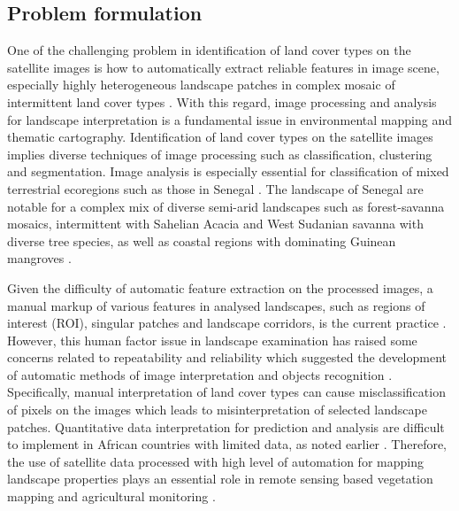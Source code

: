 \documentclass[land,article,submit,pdftex,moreauthors]{Definitions/mdpi}
\begin{document}
\subsection{Problem formulation}

One of the challenging problem in identification of land cover types on the satellite images is how to automatically extract reliable features in image scene, especially highly heterogeneous landscape patches in complex mosaic of intermittent land cover types \cite{CAMPOS2018211,SYIFA2020919}. With this regard, image processing and analysis for landscape interpretation is a fundamental issue in environmental mapping and thematic cartography. Identification of land cover types on the satellite images implies diverse techniques of image processing such as classification, clustering and segmentation. Image analysis is especially essential for classification of mixed terrestrial ecoregions such as those in Senegal \cite{BUDDE2004481}. The landscape of Senegal are notable for a complex mix of diverse semi-arid landscapes such as forest-savanna mosaics, intermittent with Sahelian Acacia and West Sudanian savanna with diverse tree species, as well as coastal regions with dominating Guinean mangroves \cite{TAPPAN2004427,DEANS2003253}.

Given the difficulty of automatic feature extraction on the processed images, a manual markup of various features in analysed landscapes, such as regions of interest (ROI), singular patches and landscape corridors, is the current practice \cite{CABRAL2017115}. However, this human factor issue in landscape examination has raised some concerns related to repeatability and reliability which suggested the development of automatic methods of image interpretation and objects recognition \cite{CONCHEDDA2008578,rs9020181,rs12091436}. Specifically, manual interpretation of land cover types can cause misclassification of pixels on the images which leads to misinterpretation of selected landscape patches. Quantitative data interpretation for prediction and analysis are difficult to implement in African countries with limited data, as noted earlier \cite{STOORVOGEL2009161}. Therefore, the use of satellite data processed with high level of automation for mapping landscape properties plays an essential role in remote sensing based vegetation mapping and agricultural monitoring \cite{PEREZHOYOS2020102064,BRANDT2016215}.  
\end{document}
